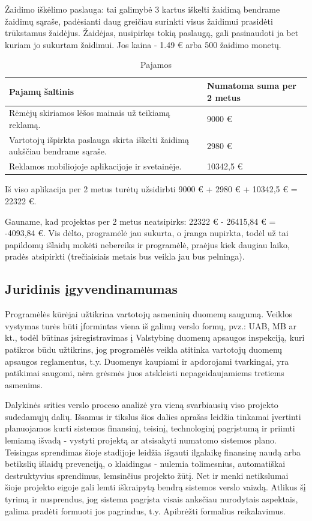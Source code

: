 \documentclass{VUMIFPSkursinis}
\begin{document}
		Žaidimo iškėlimo paslauga: tai galimybė 3 kartus iškelti žaidimą bendrame
		žaidimų sąraše, padėsianti daug greičiau surinkti visus žaidimui prasidėti 
		trūkstamus žaidėjus. Žaidėjas, nusipirkęs tokią paslaugą, gali pasinaudoti 
		ja bet kuriam jo sukurtam žaidimui. Jos kaina - 1.49 € arba 500 žaidimo 
		monetų.

		\begin{longtable}{ | m{10cm} | m{6cm} | }
		\caption{Pajamos}
		\label{variability_impl_mech}
		\endhead
		 \hline			

		\textbf{Pajamų šaltinis} & \textbf{Numatoma suma per 2 metus} \tabularnewline \hline
		Rėmėjų skiriamos lėšos mainais už teikiamą reklamą. & 9000 € \tabularnewline \hline
		Vartotojų išpirkta paslauga skirta iškelti žaidimą aukščiau bendrame sąraše. & 2980  € \tabularnewline \hline
		Reklamos mobiliojoje aplikacijoje ir svetainėje. & 10342,5 €\tabularnewline \hline
		\end{longtable}
		
		Iš viso aplikacija per 2 metus turėtų užsidirbti 9000 € + 2980 € + 10342,5 €
		= 22322 €.

		Gauname, kad projektas per 2 metus neatsipirks: 22322 € - 26415,84 € = 
		-4093,84 €. Vis dėlto, programėlė jau sukurta, o įranga nupirkta, todėl 
		už tai papildomų išlaidų mokėti nebereiks ir programėlė, praėjus kiek 
		daugiau laiko, pradės atsipirkti (trečiaisiais metais bus veikla jau bus 
		pelninga).
		
	\subsection{Juridinis įgyvendinamumas}
		Programėlės kūrėjai užtikrina vartotojų asmeninių duomenų saugumą. 
		Veiklos vystymas turės būti įformintas viena iš galimų verslo formų, 
		pvz.: UAB, MB ar kt., todėl būtinas įsiregistravimas į Valstybinę 
		duomenų apsaugos inspekciją, kuri patikros būdu užtikrins, jog 
		programėlės veikla atitinka vartotojų duomenų apsaugos reglamentus, 
		t.y. Duomenys kaupiami ir apdorojami tvarkingai, yra patikimai saugomi, 
		nėra grėsmės juos atskleisti nepageidaujamiems tretiems asmenims.
		
	Dalykinės srities verslo proceso analizė yra vieną svarbiausių viso projekto 
	sudedamųjų dalių. Išsamus ir tikslus šios dalies aprašas leidžia tinkamai 
	įvertinti planuojamos kurti sistemos finansinį, teisinį, technologinį 
	pagrįstumą ir priimti lemiamą išvadą - vystyti projektą ar atsisakyti 
	numatomo sistemos plano. Teisingas sprendimas šioje stadijoje leidžia 
	išgauti ilgalaikę finansinę naudą arba betikslių išlaidų prevenciją, o 
	klaidingas - nulemia tolimesnius, automatiškai destruktyvius sprendimus, 
	lemsinčius projekto žūtį. Net ir menki netikslumai šioje projekto eigoje 
	gali lemti iškraipytą bendrą sistemos verslo vaizdą. Atlikus šį tyrimą ir 
	nusprendus, jog sistema pagrįsta visais anksčiau nurodytais aspektais, galima 
	pradėti formuoti jos pagrindus, t.y. Apibrėžti formalius reikalavimus.
\end{document}
